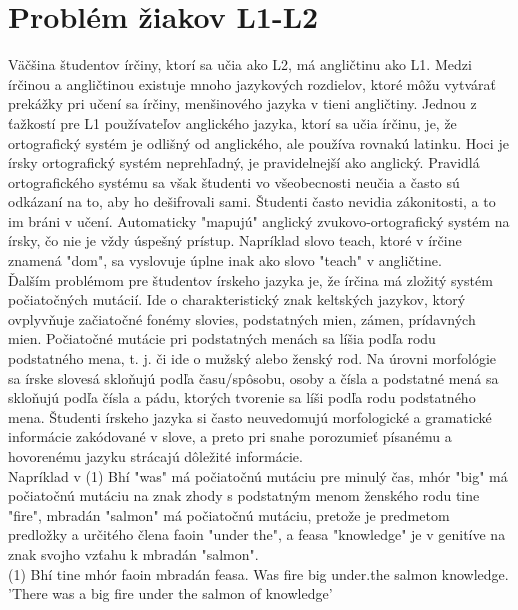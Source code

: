 \documentclass[10pt,twoside,slovak,a4paper]{article}
\begin{document}
\section{Problém žiakov L1-L2}
\qquad Väčšina študentov írčiny, ktorí sa učia ako L2, má angličtinu ako L1. Medzi írčinou a angličtinou existuje mnoho jazykových rozdielov, ktoré môžu vytvárať prekážky pri učení sa írčiny, menšinového jazyka v tieni angličtiny. Jednou z ťažkostí pre L1 používateľov anglického jazyka, ktorí sa učia írčinu, je, že ortografický systém je odlišný od anglického, ale používa rovnakú latinku. Hoci je írsky ortografický systém neprehľadný, je pravidelnejší ako anglický. Pravidlá ortografického systému sa však študenti vo všeobecnosti neučia a často sú odkázaní na to, aby ho dešifrovali sami. Študenti často nevidia zákonitosti, a to im bráni v učení. Automaticky "mapujú" anglický zvukovo-ortografický systém na írsky, čo nie je vždy úspešný prístup. Napríklad slovo teach, ktoré v írčine znamená "dom", sa vyslovuje úplne inak ako slovo "teach" v angličtine. \cite{BibEntry2022May} \\

Ďalším problémom pre študentov írskeho jazyka je, že írčina má zložitý systém počiatočných mutácií. Ide o charakteristický znak keltských jazykov, ktorý ovplyvňuje začiatočné fonémy slovies, podstatných mien, zámen, prídavných mien. Počiatočné mutácie pri podstatných menách sa líšia podľa rodu podstatného mena, t. j. či ide o mužský alebo ženský rod. Na úrovni morfológie sa írske slovesá skloňujú podľa času/spôsobu, osoby a čísla a podstatné mená sa skloňujú podľa čísla a pádu, ktorých tvorenie sa líši podľa rodu podstatného mena.  Študenti írskeho jazyka si často neuvedomujú morfologické a gramatické informácie zakódované v slove, a preto pri snahe porozumieť písanému a hovorenému jazyku strácajú dôležité informácie.\\

 Napríklad v (1) Bhí "was" má počiatočnú mutáciu pre minulý čas, mhór "big" má počiatočnú mutáciu na znak zhody s podstatným menom ženského rodu tine "fire", mbradán "salmon" má počiatočnú mutáciu, pretože je predmetom predložky a určitého člena faoin "under the", a feasa "knowledge" je v genitíve na znak svojho vzťahu k mbradán "salmon".\cite{BibEntry2022May}\\

(1) Bhí tine mhór faoin mbradán feasa. Was fire big under.the salmon knowledge. 'There was a big fire under the salmon of knowledge'\\
\end{document}
